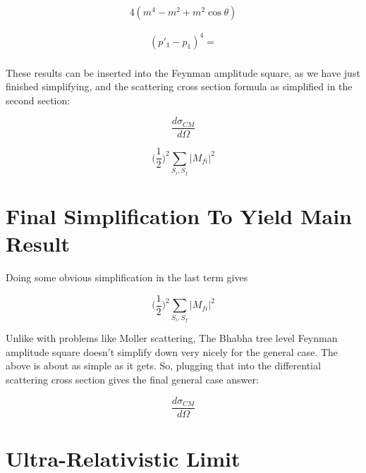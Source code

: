 \documentclass[a4]{article}
\begin{document}
    \begin{equation}
        4 (m^4 - m^2 + m^2 \cos \theta)
    \end{equation}

    \begin{eqnarray}
        (p'_1 - p_1)^4 = \\
    \end{eqnarray}

    These results can be inserted into the Feynman amplitude square, as we have just finished simplifying, and the scattering cross section formula as simplified in the second section:

    \begin{equation}
        \frac{d \sigma_{CM}}{d \Omega}
    \end{equation}

    \begin{equation}
        \Big( \frac{1}{2} \Big)^2 \sum_{S_i, S_f} |M_{f i}|^2
    \end{equation}

    \section*{Final Simplification To Yield Main Result}

    Doing some obvious simplification in the last term gives

    \begin{equation}
        \Big( \frac{1}{2} \Big)^2 \sum_{S_i, S_f} |M_{f i}|^2
    \end{equation}

    Unlike with problems like Moller scattering, The Bhabha tree level Feynman amplitude square doesn't simplify down very nicely for the general case. The above is about as simple as it gets. So, plugging
    that into the differential scattering cross section gives the final general case answer:

    \begin{framed}
        \begin{equation}
            \frac{d \sigma_{CM}}{d \Omega}
        \end{equation}
    \end{framed}

    \section*{Ultra-Relativistic Limit}
\end{document}
